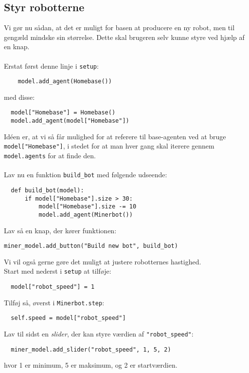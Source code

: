 \documentclass[12pt]{article}
\begin{document}
\subsection{Styr robotterne}
Vi gør nu sådan, at det er muligt for basen at producere en ny robot, men til gengæld mindske sin størrelse. Dette skal brugeren selv kunne styre ved hjælp af en knap.\\\\
Erstat først denne linje i \texttt{setup}:
\begin{lstlisting}
    model.add_agent(Homebase())
\end{lstlisting}
med disse:
\begin{lstlisting}
  model["Homebase"] = Homebase()
  model.add_agent(model["Homebase"])
\end{lstlisting}
Idéen er, at vi så får mulighed for at referere til base-agenten ved at bruge \texttt{model["Homebase"]}, i stedet for at man hver gang skal iterere gennem \texttt{model.agents} for at finde den.\\\\
Lav nu en funktion \texttt{build\_bot} med følgende udseende:
\begin{lstlisting}
  def build_bot(model):
      if model["Homebase"].size > 30:
          model["Homebase"].size -= 10
          model.add_agent(Minerbot())
\end{lstlisting}
Lav så en knap, der kører funktionen:
\begin{lstlisting}
miner_model.add_button("Build new bot", build_bot)
\end{lstlisting}
Vi vil også gerne gøre det muligt at justere robotternes hastighed.\\
Start med nederst i \texttt{setup} at tilføje:
\begin{lstlisting}
  model["robot_speed"] = 1
\end{lstlisting}
Tilføj så, øverst i \texttt{Minerbot.step}:
\begin{lstlisting}
  self.speed = model["robot_speed"]
\end{lstlisting}
Lav til sidst en \textit{slider}, der kan styre værdien af \texttt{"robot\_speed"}:
\begin{lstlisting}
  miner_model.add_slider("robot_speed", 1, 5, 2)
\end{lstlisting}
hvor 1 er minimum, 5 er maksimum, og 2 er startværdien.

\end{document}
